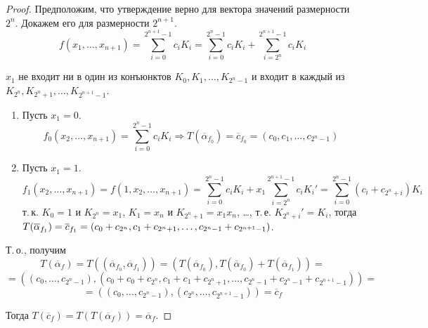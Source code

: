 \begin{enumerate}
\begin{proof}
		\indstep Предположим, что утверждение верно для вектора значений размерности $2^n$.
		Докажем его для размерности $2^{n+1}$.
		\begin{equation*}
		f(x_1, \ldots, x_{n+1}) =
		\sum_{i=0}^{2^{n+1} - 1} c_i K_i =
		\sum_{i=0}^{2^n - 1} c_i K_i + \sum_{i=2^n}^{2^{n+1} - 1} c_i K_i
		\end{equation*}
		
		$x_1$ не входит ни в один из конъюнктов $K_0, K_1, \ldots, K_{2^n - 1}$ и входит в каждый из $K_{2^n}, K_{2^n + 1}, \ldots, K_{2^{n+1} - 1}$.
		\begin{enumerate}
			\item Пусть $x_1 = 0$.
			\begin{equation*}
			f_0(x_2, \ldots, x_{n+1}) = \sum_{i=0}^{2^n - 1} c_i K_i \Rightarrow
			T(\overline\alpha_{f_0}) = \overline c_{f_0} = (c_0, c_1, \ldots, c_{2^n - 1})
			\end{equation*}
			
			\item Пусть $x_1 = 1$.
			\begin{equation*}
			f_1(x_2, \ldots, x_{n+1}) =
			f(1, x_2, \ldots, x_{n+1}) =			
			\sum_{i=0}^{2^n - 1} c_i K_i + x_1 \sum_{i=2^n}^{2^{n+1} - 1} c_i K_i' =
			\sum_{i=0}^{2^n - 1} (c_i + c_{2^n + i}) K_i
			\end{equation*}
			т.\,к. $K_0 = 1$ и $K_{2^n} = x_1$, $K_1 = x_n$ и $K_{2^n + 1} = x_1 x_n$, \ldots, т.\,е. $K_{2^n + i}' = K_i$, тогда $T(\overline\alpha_{f_1}) \opbr= \overline c_{f_1} \opbr= (c_0 + c_{2^n}, c_1 + c_{2^n + 1}, \ldots, c_{2^n - 1} + c_{2^{n+1} - 1})$.
		\end{enumerate}
		
		Т.\,о., получим
		\begin{equation*}
		T(\overline\alpha_f) =
		T((\overline\alpha_{f_0}, \overline\alpha_{f_1})) =
		(T(\overline\alpha_{f_0}), T(\overline\alpha_{f_0}) + T(\overline\alpha_{f_1})) =
		\end{equation*}
		\begin{equation*}
		= ((c_0, \ldots, c_{2^n - 1}), (c_0 + c_0 + c_{2^n}, c_1 + c_1 + c_{2^n + 1}, \ldots, c_{2^n - 1} + c_{2^n - 1} + c_{2^{n+1} - 1})) =
		\end{equation*}
		\begin{equation*}
		= ((c_0, \ldots, c_{2^n - 1}), (c_{2^n}, \ldots, c_{2^{n+1} - 1})) =
		\overline c_f
		\end{equation*}
		\indend
		
	Тогда $T(\overline c_f) = T(T(\overline\alpha_f)) = \overline\alpha_f$.
	\end{proof}
\end{enumerate}